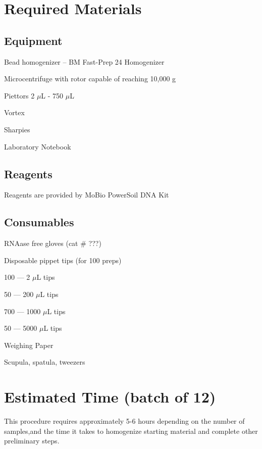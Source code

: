 \documentclass[12pt]{../SOP4_alpha}\usepackage[]{graphicx}\usepackage[]{xcolor}
\begin{document}
\section{Required Materials}

\subsection*{Equipment}

\NP Bead homogenizer -- BM Fast-Prep 24 Homogenizer

\NP Microcentrifuge with rotor capable of reaching 10,000 g

\NP Piettors 2 $\mu$L - 750 $\mu$L

\NP Vortex

\NP Sharpies

\NP Laboratory Notebook

\subsection*{Reagents}

\NP Reagents are provided by MoBio PowerSoil DNA Kit 

\subsection*{Consumables}

\NP RNAase free gloves (cat \# ???)

\NP Disposable pippet tips (for 100 preps) 

\begin{itemize*}
  \item 100 --- 2 $\mu$L tips
  \item 50 --- 200 $\mu$L tips
  \item 700 --- 1000 $\mu$L tips
  \item 50 --- 5000 $\mu$L tips
\end{itemize*}

\NP Weighing Paper

\NP Scupula, spatula, tweezers

\section{Estimated Time (batch of 12)}

\NP This procedure requires approximately 5-6 hours depending on the number of samples,and the time it takes to homogenize starting material and complete other preliminary steps.
\end{document}
